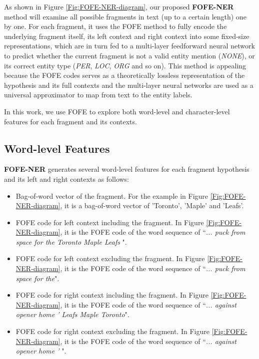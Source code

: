 \documentclass[11pt,a4paper]{article}
\begin{document}
As shown in Figure \ref{Fig:FOFE-NER-diagram}, our proposed \textbf{FOFE-NER} method will examine all possible fragments in text (up to a certain length) one by one. For each fragment, it uses the FOFE method to fully encode the underlying fragment itself, its left context and right context into some fixed-size representations, which are in turn fed to a multi-layer feedforward neural network to predict whether the current fragment is not a valid entity mention ({\it NONE}), or its correct entity type ({\it PER}, {\it LOC}, {\it ORG} and so on). This method is appealing because the FOFE codes serves as a theoretically lossless representation of the hypothesis and its full contexts and the multi-layer neural networks are used as a universal approximator to map from text to the entity labels. 


In this work, we use FOFE to explore both word-level and character-level features for each fragment and its contexts. 

\subsection{Word-level Features}

\textbf{FOFE-NER} generates several word-level features for each fragment hypothesis and its left and right contexts as follows:

\begin{itemize}
	\item Bag-of-word vector of the fragment.  For the example in Figure \ref{Fig:FOFE-NER-diagram}, it is a bag-of-word vector of 'Toronto', 'Maple' and 'Leafs'. 
	\item FOFE code for left context including the fragment. In Figure \ref{Fig:FOFE-NER-diagram}, it is the FOFE code of the word sequence of ``{\it ... puck from space for the Toronto Maple Leafs  }".
	\item FOFE code for left context excluding the fragment. In Figure \ref{Fig:FOFE-NER-diagram}, it is the FOFE code of the word sequence of ``{\it ... puck from space for the}".	
	\item FOFE code for right context including the fragment. In Figure \ref{Fig:FOFE-NER-diagram}, it is the FOFE code of the word sequence of ``{\it   ... against opener home ' Leafs  Maple  Toronto}".
	\item FOFE code for right context excluding the fragment. In Figure \ref{Fig:FOFE-NER-diagram}, it is the FOFE code of the word sequence of ``{\it ... against opener home ' }".
\end{itemize}
\end{document}
